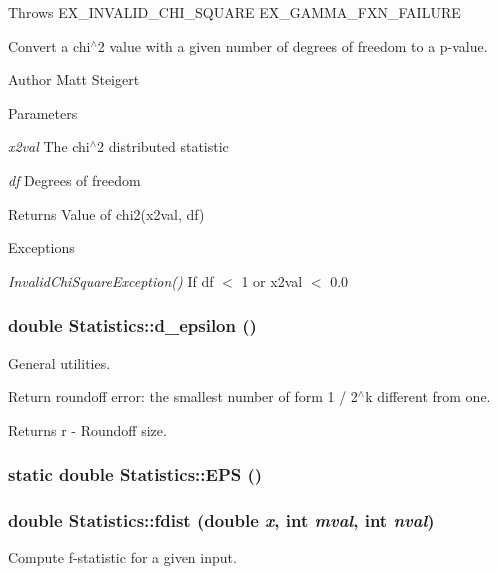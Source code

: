 Throws EX\_\-INVALID\_\-CHI\_\-SQUARE EX\_\-GAMMA\_\-FXN\_\-FAILURE

Convert a chi$^\wedge$2 value with a given number of degrees of freedom to a p-\/value.

\begin{DoxyAuthor}{Author}
Matt Steigert 
\end{DoxyAuthor}

\begin{DoxyParams}{Parameters}
\item[{\em x2val}]The chi$^\wedge$2 distributed statistic \item[{\em df}]Degrees of freedom \end{DoxyParams}
\begin{DoxyReturn}{Returns}
Value of chi2(x2val, df)
\end{DoxyReturn}

\begin{DoxyExceptions}{Exceptions}
\item[{\em InvalidChiSquareException()}]If df $<$ 1 or x2val $<$ 0.0 \end{DoxyExceptions}
\hypertarget{classStatistics_a51af50a7c894127977d718981c54b728}{
\subsubsection[{d\_\-epsilon}]{\setlength{\rightskip}{0pt plus 5cm}double Statistics::d\_\-epsilon ()}}
\label{classStatistics_a51af50a7c894127977d718981c54b728}


General utilities. 

Return roundoff error: the smallest number of form 1 / 2$^\wedge$k different from one.

\begin{DoxyReturn}{Returns}
r -\/ Roundoff size. 
\end{DoxyReturn}
\hypertarget{classStatistics_a5ad507e0d20b4af70a7691d6ad0ef1a0}{
\subsubsection[{EPS}]{\setlength{\rightskip}{0pt plus 5cm}static double Statistics::EPS ()}}
\label{classStatistics_a5ad507e0d20b4af70a7691d6ad0ef1a0}
\hypertarget{classStatistics_a2b6ee0e84409d64cd26377258750c61b}{
\subsubsection[{fdist}]{\setlength{\rightskip}{0pt plus 5cm}double Statistics::fdist (double {\em x}, \/  int {\em mval}, \/  int {\em nval})}}
\label{classStatistics_a2b6ee0e84409d64cd26377258750c61b}
Compute f-\/statistic for a given input.

